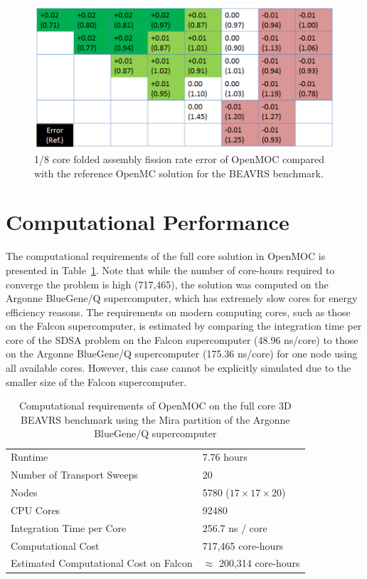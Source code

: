 \begin{figure}[ht!]
	\centering
	\includegraphics[width=\linewidth]{figures/results/full-core/folded-1-8-core-assembly-rr.png}
	\caption{1/8 core folded assembly fission rate error of OpenMOC compared with the reference OpenMC solution for the BEAVRS benchmark.}
	\label{fig:assembly-rr}
\end{figure}

\section{Computational Performance}
\label{sec:fc-computational-performance}

The computational requirements of the full core solution in OpenMOC is presented in Table~\ref{tab:full-core-comp-req}. Note that while the number of core-hours required to converge the problem is high (717,465), the solution was computed on the Argonne BlueGene/Q supercomputer, which has extremely slow cores for energy efficiency reasons. The requirements on modern computing cores, such as those on the Falcon supercomputer, is estimated by comparing the integration time per core of the SDSA problem on the Falcon supercomputer (48.96 ns/core) to those on the Argonne BlueGene/Q supercomputer (175.36 ns/core) for one node using all available cores. However, this case cannot be explicitly simulated due to the smaller size of the Falcon supercomputer.

\begin{table}[ht]
	\centering
	\caption{Computational requirements of OpenMOC on the full core 3D BEAVRS benchmark using the Mira partition of the Argonne BlueGene/Q supercomputer}
	\medskip
	\begin{tabular}{l|l}
		\hline
		Runtime & 7.76 hours \\
		Number of Transport Sweeps & 20 \\
		Nodes & 5780 ($17 \times 17 \times 20$) \\
		CPU Cores & 92480 \\
		Integration Time per Core & 256.7 ns / core \\
		Computational Cost & 717,465 core-hours \\
		Estimated Computational Cost on Falcon & $\approx$ 200,314 core-hours \\
		\hline
	\end{tabular}
	\label{tab:full-core-comp-req}
\end{table}

